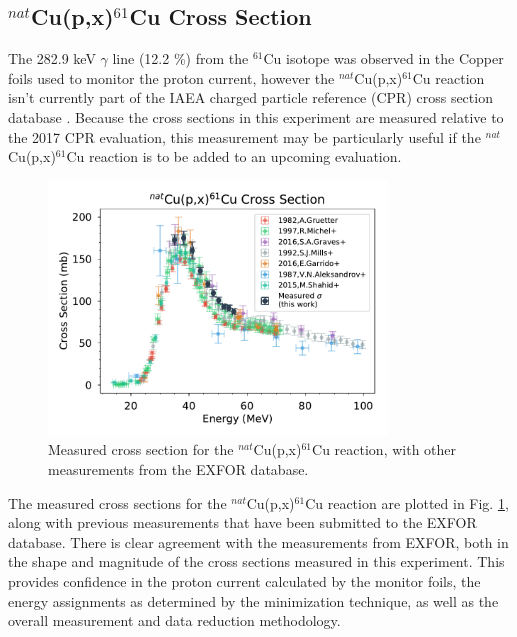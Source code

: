 \documentclass[aps,superscriptaddress,twocolumn,secnumarabic,balancelastpage,amsmath,amssymb,nofootinbib,floatfix]{revtex4-1}
\begin{document}
\subsection{$^{nat}$Cu(p,x)$^{61}$Cu Cross Section}

The 282.9 keV $\gamma$ line (12.2 \%) from the $^{61}$Cu isotope was observed in the Copper foils used to monitor the proton current, however the $^{nat}$Cu(p,x)$^{61}$Cu reaction isn't currently part of the IAEA charged particle reference (CPR) cross section database \cite{IAEACPR}.  Because the cross sections in this experiment are measured relative to the 2017 CPR evaluation, this measurement may be particularly useful if the $^{nat}$Cu(p,x)$^{61}$Cu reaction is to be added to an upcoming evaluation.

\begin{figure}[htb]
\includegraphics[width=9cm]{cross_sections/61CU}
\caption{Measured cross section for the $^{nat}$Cu(p,x)$^{61}$Cu reaction, with other measurements from the EXFOR database.
}
\label{fig:61CU}
\end{figure}

The measured cross sections for the $^{nat}$Cu(p,x)$^{61}$Cu reaction are plotted in Fig. \ref{fig:61CU}, along with previous measurements that have been submitted to the EXFOR database.  There is clear agreement with the measurements from EXFOR, both in the shape and magnitude of the cross sections measured in this experiment.  This provides confidence in the proton current calculated by the monitor foils, the energy assignments as determined by the minimization technique, as well as the overall measurement and data reduction methodology.
\end{document}
